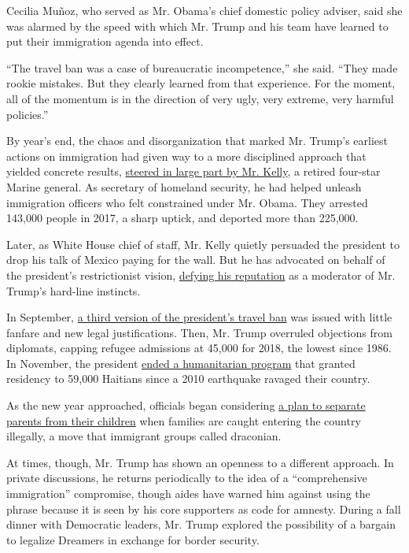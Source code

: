 Cecilia Muñoz, who served as Mr. Obama's chief domestic policy adviser,
said she was alarmed by the speed with which Mr. Trump and his team have
learned to put their immigration agenda into effect.

``The travel ban was a case of bureaucratic incompetence,'' she said.
``They made rookie mistakes. But they clearly learned from that
experience. For the moment, all of the momentum is in the direction of
very ugly, very extreme, very harmful policies.''

By year's end, the chaos and disorganization that marked Mr. Trump's
earliest actions on immigration had given way to a more disciplined
approach that yielded concrete results,
\href{https://www.nytimes3xbfgragh.onion/2017/07/28/us/politics/john-kelly-chief-of-staff-donald-trump.html}{steered
in large part by Mr. Kelly}, a retired four-star Marine general. As
secretary of homeland security, he had helped unleash immigration
officers who felt constrained under Mr. Obama. They arrested 143,000
people in 2017, a sharp uptick, and deported more than 225,000.

Later, as White House chief of staff, Mr. Kelly quietly persuaded the
president to drop his talk of Mexico paying for the wall. But he has
advocated on behalf of the president's restrictionist vision,
\href{https://www.nytimes3xbfgragh.onion/2017/10/25/us/politics/trump-kelly.html}{defying
his reputation} as a moderator of Mr. Trump's hard-line instincts.

In September,
\href{https://www.nytimes3xbfgragh.onion/2017/09/24/us/politics/new-order-bars-almost-all-travel-from-seven-countries.html}{a
third version of the president's travel ban} was issued with little
fanfare and new legal justifications. Then, Mr. Trump overruled
objections from diplomats, capping refugee admissions at 45,000 for
2018, the lowest since 1986. In November, the president
\href{https://www.nytimes3xbfgragh.onion/2017/11/20/us/haitians-temporary-status.html}{ended
a humanitarian program} that granted residency to 59,000 Haitians since
a 2010 earthquake ravaged their country.

As the new year approached, officials began considering
\href{https://www.nytimes3xbfgragh.onion/2017/12/21/us/trump-immigrant-families-separate.html}{a
plan to separate parents from their children} when families are caught
entering the country illegally, a move that immigrant groups called
draconian.

At times, though, Mr. Trump has shown an openness to a different
approach. In private discussions, he returns periodically to the idea of
a ``comprehensive immigration'' compromise, though aides have warned him
against using the phrase because it is seen by his core supporters as
code for amnesty. During a fall dinner with Democratic leaders, Mr.
Trump explored the possibility of a bargain to legalize Dreamers in
exchange for border security.

